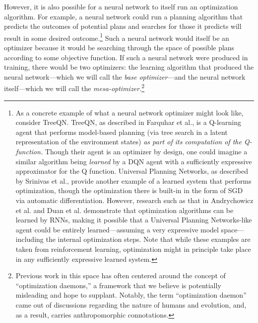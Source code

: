 \documentclass[
  onecolumn,
  natbib,
]{miri-tech-article}
\begin{document}
However, it is also possible for a neural network to itself run an optimization algorithm. For example, a neural network could run a planning algorithm that predicts the outcomes of potential plans and searches for those it predicts will result in some desired outcome.\footnote{As a concrete example of what a neural network optimizer might look like, consider TreeQN.\cite{treeqn} TreeQN, as described in Farquhar et al., is a Q-learning agent that performs model-based planning (via tree search in a latent representation of the environment states) \textit{as part of its computation of the Q-function.} Though their agent is an optimizer by design, one could imagine a similar algorithm being \textit{learned} by a DQN agent with a sufficiently expressive approximator for the Q function. Universal Planning Networks, as described by Srinivas et al.,\cite{univ_plan_net} provide another example of a learned system that performs optimization, though the optimization there is built-in in the form of SGD via automatic differentiation. However, research such as that in Andrychowicz et al.\cite{grad_by_grad} and Duan et al.\cite{rl2} demonstrate that optimization algorithms can be learned by RNNs, making it possible that a Universal Planning Networks-like agent could be entirely learned---assuming a very expressive model space---including the internal optimization steps. Note that while these examples are taken from reinforcement learning, optimization might in principle take place in any sufficiently expressive learned system.} Such a neural network would itself be an optimizer because it would be searching through the space of possible plans according to some objective function. If such a neural network were produced in training, there would be two optimizers: the learning algorithm that produced the neural network---which we will call the \textit{base optimizer}---and the neural network itself---which we will call the \textit{mesa-optimizer.}\footnote{Previous work in this space has often centered around the concept of ``optimization daemons,''\cite{arbital_daemons} a framework that we believe is potentially misleading and hope to supplant. Notably, the term ``optimization daemon'' came out of discussions regarding the nature of humans and evolution, and, as a result, carries anthropomorphic connotations.}
\end{document}
